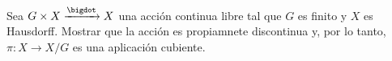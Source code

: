 \begin{ejercicio}
    Sea $G\times X\xrightarrow{\bigdot} X$ una acción continua libre tal que $G$ es finito y $X$ es Hausdorff. Mostrar que la acción es propiamnete discontinua y, por lo tanto, $\pi:X\to X/G$ es una aplicación cubiente.
\end{ejercicio}

\begin{demostracion}

\end{demostracion}
